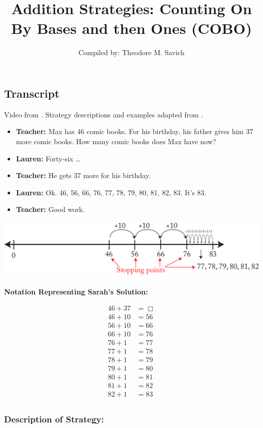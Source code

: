 \documentclass[11pt]{article}
\title{Addition Strategies: Counting On By Bases and then Ones (COBO)}
\author{Compiled by: Theodore M. Savich}
\begin{document}
\maketitle
\subsection*{Transcript}
Video from \textcite{Carpenter1999}. Strategy descriptions and examples adapted from \textcite{HackenbergCourseNotes}. 
\begin{itemize}
\item \textbf{Teacher:} Max  has  46  comic  books. For  his  birthday,  his  father  gives him  37  more  comic  books. How  many  comic  books  does  Max  have  now? 

\item \textbf{Lauren:} Forty-six  \ldots 
\item \textbf{Teacher:} He  gets  37  more  for  his  birthday. 
\item  \textbf{Lauren:} Ok. 46,  56, 66,  76,  77, 78,  79,  80,  81, 82,  83. It's  83. 
\item \textbf{Teacher:} Good  work.
\end{itemize}

\includegraphics[width=.8\textwidth]{images/Easy_Pictures/SAR_ADD_COBO/PDF/SAR_ADD_COBO.pdf}

\noindent \textbf{Notation Representing Sarah's Solution:}

\begin{align*}
46 + 37 &= \Box \\
46+10 &= 56\\
56+10 &= 66\\
66+10 &= 76\\
76+1 &= 77\\
77+1 &= 78\\
78+1 &= 79\\
79+1 &= 80\\
80+1 &= 81\\
81+1 &= 82\\
82+1 &= 83\\
\end{align*}

\subsubsection*{Description of Strategy:}
\end{document}
